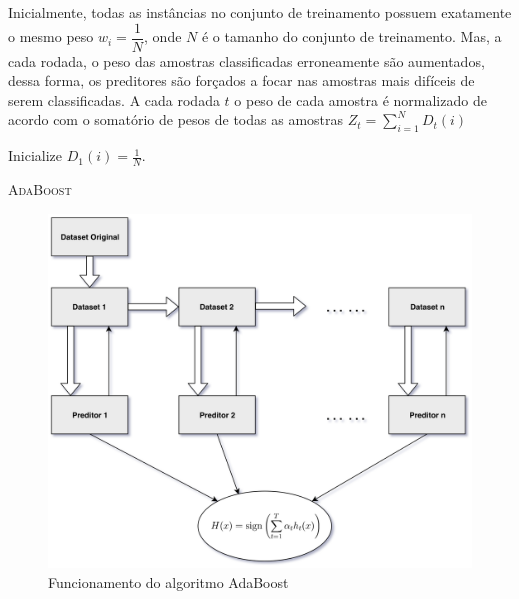 Inicialmente, todas as instâncias no conjunto de treinamento possuem exatamente o mesmo peso $w_i = \dfrac{1}{N}$, onde $N$ é o tamanho do conjunto de treinamento. Mas, a cada rodada, o peso das amostras classificadas erroneamente são aumentados, dessa forma, os preditores são forçados a focar nas amostras mais difíceis de serem classificadas. A cada rodada $t$ o peso de cada amostra é normalizado de acordo com o somatório de pesos de todas as amostras $Z_t = \sum_{i=1}^{N} D_t(i)$


%
 \begin{algorithm}[H]
   \SetAlgoLined
   
   Inicialize $D_1(i) = \frac{1}{N}$.   
   
   
   \label{alg:adaboost}
   \caption{\textsc{AdaBoost}}
 \end{algorithm}
%

\begin{figure}[ht!] 
    \centering
    \includegraphics[scale=0.15]{Imagens/Model-Adaboost.png}
    \caption{Funcionamento do algoritmo AdaBoost}
    \label{fig:adaboost}
\end{figure}

